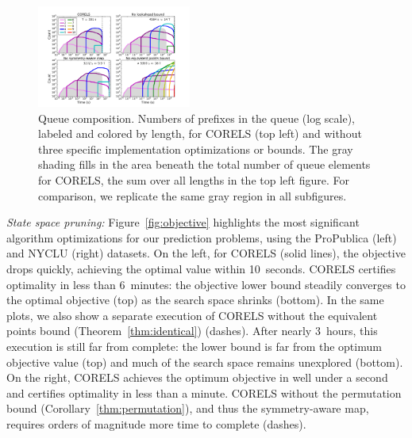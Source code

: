 \begin{figure}[t!]
\begin{center}
\includegraphics[trim={30mm 15mm 35mm 30mm},
width=0.45\textwidth]{figs/kdd_compas_ablation_small-queue.pdf}
\end{center}
\caption{Queue composition.
%
Numbers of prefixes in the queue (log scale), labeled and colored by length,
for CORELS (top left) and without three specific implementation optimizations or bounds.
%
The gray shading fills in the area beneath the total number of
queue elements for CORELS,
\ie the sum over all lengths in the top left figure.
%
For comparison, we replicate the same gray region in all subfigures.
}
\label{fig:queue}
\end{figure}


\textit{State space pruning:}
Figure~\ref{fig:objective} highlights the most significant
algorithm optimizations for our prediction problems,
using the ProPublica (left) and NYCLU (right) datasets.
%
On the left, for CORELS (solid lines),
the objective drops quickly, achieving the optimal value within 10~seconds.
%
CORELS certifies optimality in less than 6~minutes:
the objective lower bound steadily converges to the optimal objective (top)
as the search space shrinks (bottom).
%
In the same plots, we also show
a separate execution of CORELS without the equivalent points bound
(Theorem~\ref{thm:identical}) (dashes).
%
After nearly 3~hours, this execution is still far from complete:
the lower bound is far from the optimum objective value (top)
and much of the search space remains unexplored (bottom).
%
On the right,
CORELS achieves the optimum objective in well under a second
and certifies optimality in less than a minute.
%
CORELS without the permutation bound (Corollary~\ref{thm:permutation}),
and thus the symmetry-aware map,
requires orders of magnitude more time to complete (dashes).

